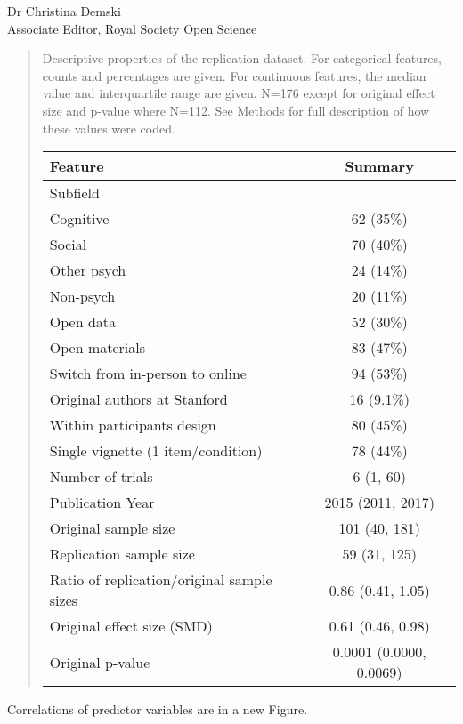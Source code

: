 \documentclass{stanfordletter}
\newcommand{\revised}[1]{\begin{quote}	#1 \end{quote}}
\begin{document}
\begin{letter}{Dr Christina Demski \\ Associate Editor, Royal Society Open Science}
          \revised{{Descriptive properties of the replication dataset. For categorical features, counts and percentages are given. For continuous features, the median value and interquartile range are given. N=176 except for original effect size and p-value where N=112. See Methods for full description of how these values were coded. }
          	{\centering
          	\fontsize{10}{12}\selectfont
          	\begin{tabular}[t]{lc}
          		\toprule
          		Feature & Summary\\
          		\midrule
          		Subfield & \\
          		\hspace{1em}Cognitive & 62 (35\%)\\
          		\hspace{1em}Social & 70 (40\%)\\
          		\hspace{1em}Other psych & 24 (14\%)\\
          		\hspace{1em}Non-psych & 20 (11\%)\\
          		Open data & 52 (30\%)\\
          		Open materials & 83 (47\%)\\
          		Switch from in-person to online & 94 (53\%)\\
          		Original authors at Stanford & 16 (9.1\%)\\
          		Within participants design & 80 (45\%)\\
          		Single vignette (1 item/condition) & 78 (44\%)\\
          		Number of trials & 6 (1, 60)\\
          		Publication Year & 2015 (2011, 2017)\\
          		Original sample size & 101 (40, 181)\\
          		Replication sample size & 59 (31, 125)\\
          		Ratio of replication/original sample sizes & 0.86 (0.41, 1.05)\\
          		Original effect size (SMD) & 0.61 (0.46, 0.98)\\
          		Original p-value & 0.0001 (0.0000, 0.0069)\\
          		\bottomrule
          	\end{tabular}}}
          
          Correlations of predictor variables are in a new Figure. 
          

\end{letter}
\end{document}

